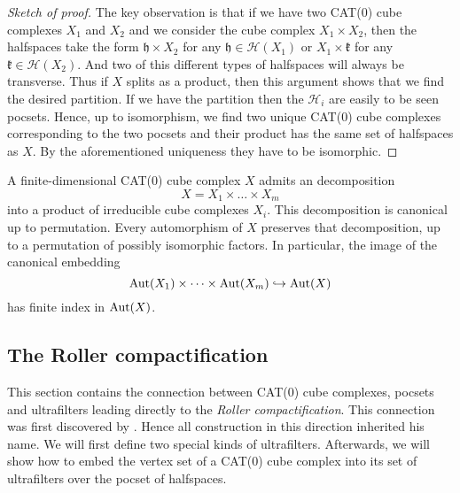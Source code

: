 \begin{proof}[Sketch of proof]
  The key observation is that if we have two CAT(0) cube complexes \(X_1\) and \(X_2\) and we consider the cube complex \(X_1 \times X_2\), then the halfspaces take the form \(\mathfrak{h} \times X_2\) for any \(\mathfrak{h} \in \mathcal{H}(X_1)\) or \(X_1 \times \mathfrak{k}\) for any \(\mathfrak{k} \in \mathcal{H}(X_2)\). And two of this different types of halfspaces will always be transverse. Thus if \(X\) splits as a product, then this argument shows that we find the desired partition. If we have the partition then the \(\mathcal{H}_i\) are easily to be seen pocsets. Hence, up to isomorphism, we find two unique CAT(0) cube complexes corresponding to the two pocsets and their product has the same set of halfspaces as \(X\). By the aforementioned uniqueness they have to be isomorphic.
\end{proof}

\begin{prop}
  \label{prop:cs-2.6}
  A finite-dimensional CAT(0) cube complex \(X\) admits an decomposition
  \[
    X = X_1 \times \dots \times X_m
  \]
  into a product of irreducible cube complexes \(X_i\). This decomposition is canonical up to permutation. Every automorphism of \(X\) preserves that decomposition, up to a permutation of possibly isomorphic factors. In particular, the image of the canonical embedding
  \[
    \operatorname{Aut}(X_1) \times \dots \times \operatorname{Aut}(X_m) \hookrightarrow \operatorname{Aut}(X)
  \]
  has finite index in \(\operatorname{Aut}(X)\).
\end{prop}

\subsection{The Roller compactification}
\label{sec:rb}

This section contains the connection between CAT(0) cube complexes, pocsets and ultrafilters leading directly to the \emph{Roller compactification}. This connection was first discovered by \textcite{Roller1999}. Hence all construction in this direction inherited his name. We will first define two special kinds of ultrafilters. Afterwards, we will show how to embed the vertex set of a CAT(0) cube complex into its set of ultrafilters over the pocset of halfspaces. 


